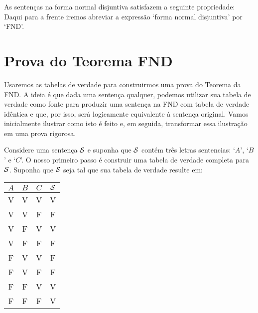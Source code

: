 As sentenças na forma normal disjuntiva satisfazem a seguinte propriedade:
Daqui para a frente iremos abreviar a expressão  `forma normal disjuntiva' por `FND'. 


\section{Prova do Teorema FND}
\label{s:DNFTruthTable}

Usaremos as tabelas de verdade para construirmos uma prova do Teorema da FND.
A ideia é que dada uma sentença qualquer, podemos utilizar sua tabela de verdade como fonte para produzir uma sentença na FND com tabela de verdade idêntica e que, por isso, será logicamente equivalente à sentença original.
Vamos inicialmente ilustrar como isto é feito e, em seguida, transformar essa ilustração em uma prova rigorosa.

Considere uma sentença $\mathcal{S}$ e suponha que $\mathcal{S}$ contém três letras sentencias:  `$A$', `$B$' e `$C$'.
O nosso primeiro passo é construir uma tabela de verdade completa para $\mathcal{S}$.
Suponha que $\mathcal{S}$ seja tal que sua tabela de verdade resulte em:
\begin{center}
\begin{tabular}{c c c | c}
$A$ & $B$ & $C$ & $\mathcal{S}$\\
\hline
 V & V & V & V \\
 V & V & F & F \\
 V & F & V & V \\
 V & F & F & F \\
 F & V & V & F \\
 F & V & F & F \\
 F & F & V & V \\
 F & F & F & V
\end{tabular}
\end{center}
%
%

